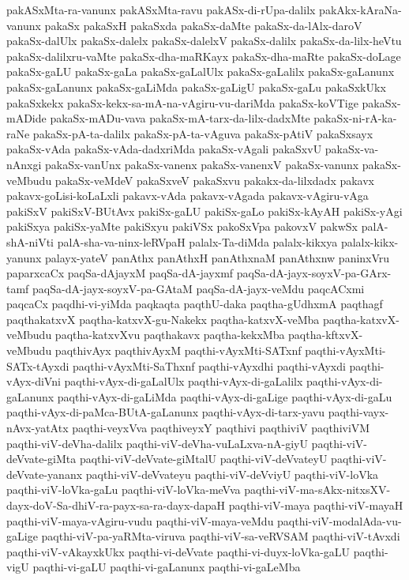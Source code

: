 {pakASxMta-ra-vanunx
pakASxMta-ravu
pakASx-di-rUpa-dalilx
pakAkx-kAraNa-vanunx
pakaSx
pakaSxH
pakaSxda
pakaSx-daMte
pakaSx-da-lAlx-daroV
pakaSx-dalUlx
pakaSx-dalelx
pakaSx-dalelxV
pakaSx-dalilx
pakaSx-da-lilx-heVtu
pakaSx-dalilxru-vaMte
pakaSx-dha-maRKayx
pakaSx-dha-maRte
pakaSx-doLage
pakaSx-gaLU
pakaSx-gaLa
pakaSx-gaLalUlx
pakaSx-gaLalilx
pakaSx-gaLanunx
pakaSx-gaLanunx
pakaSx-gaLiMda
pakaSx-gaLigU
pakaSx-gaLu
pakaSxkUkx
pakaSxkekx
pakaSx-kekx-sa-mA-na-vAgiru-vu-dariMda
pakaSx-koVTige
pakaSx-mADide
pakaSx-mADu-vava
pakaSx-mA-tarx-da-lilx-dadxMte
pakaSx-ni-rA-ka-raNe
pakaSx-pA-ta-dalilx
pakaSx-pA-ta-vAguva
pakaSx-pAtiV
pakaSxsayx
pakaSx-vAda
pakaSx-vAda-dadxriMda
pakaSx-vAgali
pakaSxvU
pakaSx-va-nAnxgi
pakaSx-vanUnx
pakaSx-vanenx
pakaSx-vanenxV
pakaSx-vanunx
pakaSx-veMbudu
pakaSx-veMdeV
pakaSxveV
pakaSxvu
pakakx-da-lilxdadx
pakavx
pakavx-goLisi-koLaLxli
pakavx-vAda
pakavx-vAgada
pakavx-vAgiru-vAga
pakiSxV
pakiSxV-BUtAvx
pakiSx-gaLU
pakiSx-gaLo
pakiSx-kAyAH
pakiSx-yAgi
pakiSxya
pakiSx-yaMte
pakiSxyu
pakiVSx
pakoSxVpa
pakovxV
pakwSx
palA-shA-niVti
palA-sha-va-ninx-leRVpaH
palalx-Ta-diMda
palalx-kikxya
palalx-kikx-yanunx
palayx-yateV
panAthx
panAthxH
panAthxnaM
panAthxnw
paninxVru
paparxcaCx
paqSa-dAjayxM
paqSa-dA-jayxmf
paqSa-dA-jayx-soyxV-pa-GArx-tamf
paqSa-dA-jayx-soyxV-pa-GAtaM
paqSa-dA-jayx-veMdu
paqcACxmi
paqcaCx
paqdhi-vi-yiMda
paqkaqta
paqthU-daka
paqtha-gUdhxmA
paqthagf
paqthakatxvX
paqtha-katxvX-gu-Nakekx
paqtha-katxvX-veMba
paqtha-katxvX-veMbudu
paqtha-katxvXvu
paqthakavx
paqtha-kekxMba
paqtha-kftxvX-veMbudu
paqthivAyx
paqthivAyxM
paqthi-vAyxMti-SATxnf
paqthi-vAyxMti-SATx-tAyxdi
paqthi-vAyxMti-SaThxnf
paqthi-vAyxdhi
paqthi-vAyxdi
paqthi-vAyx-diVni
paqthi-vAyx-di-gaLalUlx
paqthi-vAyx-di-gaLalilx
paqthi-vAyx-di-gaLanunx
paqthi-vAyx-di-gaLiMda
paqthi-vAyx-di-gaLige
paqthi-vAyx-di-gaLu
paqthi-vAyx-di-paMca-BUtA-gaLanunx
paqthi-vAyx-di-tarx-yavu
paqthi-vayx-nAvx-yatAtx
paqthi-veyxVva
paqthiveyxY
paqthivi
paqthiviV
paqthiviVM
paqthi-viV-deVha-dalilx
paqthi-viV-deVha-vuLaLxva-nA-giyU
paqthi-viV-deVvate-giMta
paqthi-viV-deVvate-giMtalU
paqthi-viV-deVvateyU
paqthi-viV-deVvate-yananx
paqthi-viV-deVvateyu
paqthi-viV-deVviyU
paqthi-viV-loVka
paqthi-viV-loVka-gaLu
paqthi-viV-loVka-meVva
paqthi-viV-ma-sAkx-nitxsXV-dayx-doV-Sa-dhiV-ra-payx-sa-ra-dayx-dapaH
paqthi-viV-maya
paqthi-viV-mayaH
paqthi-viV-maya-vAgiru-vudu
paqthi-viV-maya-veMdu
paqthi-viV-modalAda-vu-gaLige
paqthi-viV-pa-yaRMta-viruva
paqthi-viV-sa-veRVSAM
paqthi-viV-tAvxdi
paqthi-viV-vAkayxkUkx
paqthi-vi-deVvate
paqthi-vi-duyx-loVka-gaLU
paqthi-vigU
paqthi-vi-gaLU
paqthi-vi-gaLanunx
paqthi-vi-gaLeMba
}
